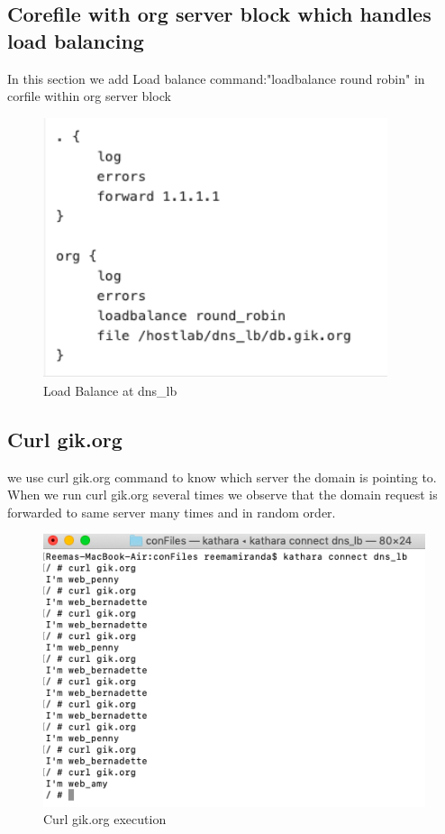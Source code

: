 \subsection{Corefile with org server block which handles load balancing}
In this section we add Load balance command:"loadbalance round robin" in corfile within org server block
\begin{figure}[H]
\centering
  \includegraphics[width=0.9\textwidth]{Images/Load_balance at dns_lb.png}
  \caption{Load Balance at dns\_lb }
  \label{fig:2.13}
\end{figure}
\subsection{Curl gik.org}
we use curl gik.org command to know which server the domain is pointing to.
When we run curl gik.org several times we observe that the domain request is forwarded to same server many times and in random order.
\begin{figure}[H]
\centering
  \includegraphics[width=1.2\textwidth]{Images/curl gik.org.png}
  \caption{Curl gik.org execution}
  \label{fig:2.14}
\end{figure}
